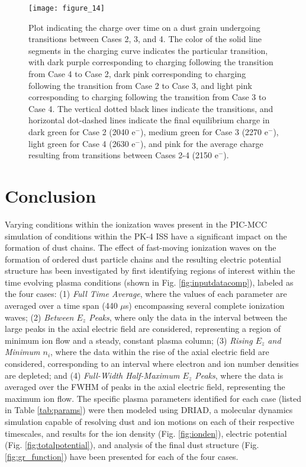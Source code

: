 \documentclass[aip,amsmath,amssymb,graphicx,floatfix,reprint]{revtex4-1}
\begin{document}
 \begin{figure}[ht]
\texttt{[image: figure\_14]}
\caption{Plot indicating the charge over time on a dust grain undergoing transitions between Cases 2, 3, and 4.  The color of the solid line segments in the charging curve indicates the particular transition, with dark purple corresponding to charging following the transition from Case 4 to Case 2, dark pink corresponding to charging following the transition from Case 2 to Case 3, and light pink corresponding to charging following the transition from Case 3 to Case 4.  The vertical dotted black lines indicate the transitions, and horizontal dot-dashed lines indicate the final equilibrium charge in dark green for Case 2 (2040 e$^-$), medium green for Case 3 (2270 e$^-$), light green for Case 4 (2630 e$^-$), and pink for the average charge resulting from transitions between Cases 2-4 (2150 e$^-$).}
\label{fig:dynamic_charging}
\end{figure}

\section{Conclusion}
\label{conclusion}
Varying conditions within the ionization waves present in the PIC-MCC simulation of conditions within the PK-4 ISS\cite{Hartmann2020} have a significant impact on the formation of dust chains.  The effect of fast-moving ionization waves on the formation of ordered dust particle chains and the resulting electric potential structure has been investigated by first identifying regions of interest within the time evolving plasma conditions (shown in Fig. \ref{fig:inputdatacomp}), labeled as the four cases: (1) \emph{Full Time Average}, where the values of each parameter are averaged over a time span (440 $\mu$s) encompassing several complete ionization waves; (2) \emph{Between $E_z$ Peaks}, where only the data in the interval between the large peaks in the axial electric field are considered, representing a region of minimum ion flow and a steady, constant plasma column; (3) \emph{Rising $E_z$ and Minimum $n_i$}, where the data within the rise of the axial electric field are considered, corresponding to an interval where electron and ion number densities are depleted; and (4) \emph{Full-Width Half-Maximum $E_z$ Peaks}, where the data is averaged over the FWHM of peaks in the axial electric field, representing the maximum ion flow.  The specific plasma parameters identified for each case (listed in Table \ref{tab:params}) were then modeled using DRIAD, a molecular dynamics simulation capable of resolving dust and ion motions on each of their respective timescales, and results for the ion density (Fig. \ref{fig:ionden}), electric potential (Fig. \ref{fig:totalpotential}), and analysis of the final dust structure (Fig. \ref{fig:gr_function}) have been presented for each of the four cases.
\end{document}
